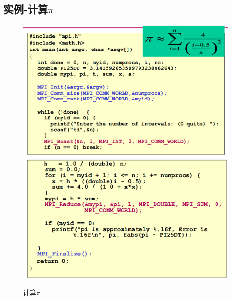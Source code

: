 \documentclass[UTF8,a4paper]{ctexart}
\begin{document}
\subsection{实例-计算$\pi$}
\begin{figure}[H]
  \centering
  \includegraphics[scale = 0.3]{assets/ParallelComputing_3f18e.png}
  \includegraphics[scale = 0.3]{assets/ParallelComputing_1a270.png}
  \caption{计算$\pi$}
\end{figure}
\end{document}
